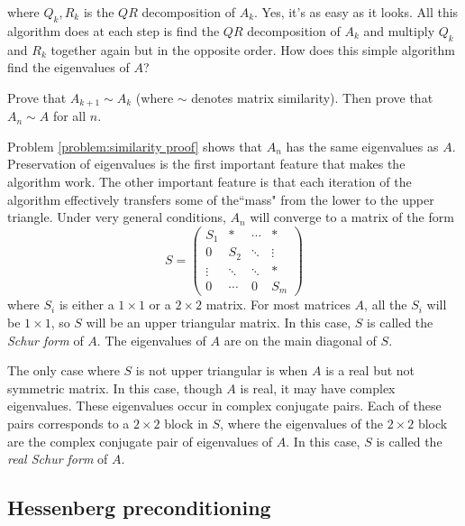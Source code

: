 where $Q_k, R_k$ is the $QR$ decomposition of $A_k$. Yes, it's as easy as it looks. All this algorithm does at each step is find the $QR$ decomposition of $A_k$ and multiply $Q_k$ and $R_k$ together again but in the opposite order. How does this simple algorithm find the eigenvalues of $A$? 

\begin{problem}
\label{problem:similarity proof}
Prove that $A_{k+1} \sim A_k$ (where $\sim$ denotes matrix similarity). Then prove that $A_n \sim A$ for all $n$.  
\end{problem}

Problem \ref{problem:similarity proof} shows that $A_n$ has the same eigenvalues as $A$. Preservation of eigenvalues is the first important feature that makes the algorithm work. The other important feature is that each iteration of the algorithm effectively transfers some of the``mass" from the lower to the upper triangle. Under very general conditions, $A_n$ will converge to a matrix of the form
\begin{equation}
\label{eq:Schur form}
S = 
     \begin{pmatrix}
          S_1 &* & \cdots & * \\
           0     &S_2  &  \ddots & \vdots \\
           \vdots  & \ddots & \ddots & *  \\
           0 & \cdots & 0 & S_m
    \end{pmatrix}
\end{equation}
where $S_i$ is either a $1 \times 1$ or a $2 \times 2$ matrix. For most matrices $A$, all the $S_i$ will be $1 \times 1$, so $S$ will be an upper triangular matrix. In this case, $S$ is called the \emph{Schur form} of $A$. The eigenvalues of $A$ are on the main diagonal of $S$.

The only case where $S$ is not upper triangular is when $A$ is a real but not symmetric matrix. In this case, though $A$ is real, it may have complex eigenvalues. These eigenvalues occur in complex conjugate pairs. Each of these pairs corresponds to a $2 \times 2$ block in $S$, where the eigenvalues of the $2 \times 2$ block are the complex conjugate pair of eigenvalues of $A$. In this case, $S$ is called the \emph{real Schur form} of $A$.

\subsection*{Hessenberg preconditioning}

